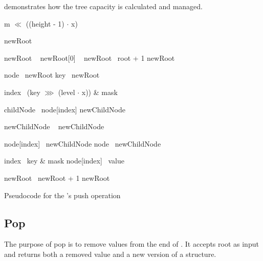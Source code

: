  demonstrates how the tree capacity is calculated and managed.

\begin{listing}[ht!]
    \begin{algorithmic}[1]
		    \State \Return m $\ll$ ((height - 1) $\cdot$ x)
        \EndFunction

            \State newRoot \la\ \nil{}

                \State newRoot \la\ 
                \State newRoot[0] \la\ 
                \State newRoot \la\ root + 1
            \Else
                \State newRoot \la\ 
            \EndIf

            \State node \la\ newRoot
            \State key \la\ newRoot

                \State index \la\ (key $\ggg$ (level $\cdot$ x)) \& mask

                \State childNode \la\ node[index]
                \State newChildNode \la\ \nil{}

                    \State newChildNode \la\ 
                \Else
                    \State newChildNode \la\ 
                \EndIf

                \State node[index] \la\ newChildNode
                \State node \la\ newChildNode
            \EndFor

            \State index \la\ key \& mask
            \State node[index] \la\ value

            \State newRoot \la\ newRoot + 1
            \State \Return newRoot
        \EndFunction
    \end{algorithmic}

    \caption{Pseudocode for the \treerb{}'s push operation}
    \label{lst:rb-tree-push}
\end{listing}

\subsection{Pop}
The purpose of pop is to remove values from the end of \treerb{}. It accepts root as input and returns both a removed value and a new version of a structure.


